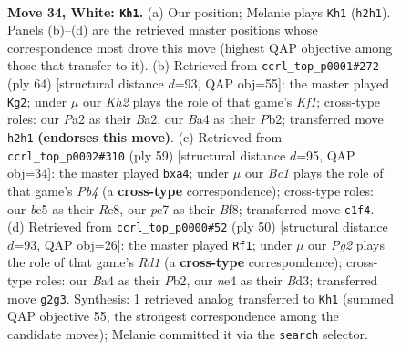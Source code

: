 \documentclass[11pt]{article}
\begin{document}
\clearpage

\begin{figure}[p]\centering
\begin{subfigure}{0.46\textwidth}\centering
\resizebox{\linewidth}{!}{%
\newchessgame
\chessboard[
  setfen={r1b5/ppp2ppk/7p/3qb3/BQ2n3/5P1P/PP4PK/R1B5 w - - 8 34},
  showmover=false,
  pgfstyle=straightmove, color=movearrow, markmove={h2-h1}
]}
\caption{}
\end{subfigure}\hfill
\begin{subfigure}{0.46\textwidth}\centering
\resizebox{\linewidth}{!}{%
\newchessgame
\chessboard[
  setfen={3r4/pp4k1/q6p/P2p1p2/1Q1bp3/6P1/BPR2P1P/5K2 w - - 2 33},
  showmover=false,
  pgfstyle=straightmove, color=movearrow, markmove={f1-g2}
]}
\caption{}
\end{subfigure}
\\[4pt]
\begin{subfigure}{0.46\textwidth}\centering
\resizebox{\linewidth}{!}{%
\newchessgame
\chessboard[
  setfen={4rb2/1bq2p1k/6pp/1pp1P2n/P7/1B2QN1P/1B3PP1/2R3K1 b - - 0 30},
  showmover=false,
  pgfstyle=straightmove, color=movearrow, markmove={b5-a4}
]}
\caption{}
\end{subfigure}\hfill
\begin{subfigure}{0.46\textwidth}\centering
\resizebox{\linewidth}{!}{%
\newchessgame
\chessboard[
  setfen={5rbk/1p4pp/2n5/p1q5/3pQ3/P2B2B1/1PP3PP/2KR4 w - - 3 26},
  showmover=false,
  pgfstyle=straightmove, color=movearrow, markmove={d1-f1}
]}
\caption{}
\end{subfigure}
\caption{\textbf{Move 34, White: \texttt{Kh1}.} (a) Our position; Melanie plays \texttt{Kh1} (\texttt{h2h1}). Panels (b)--(d) are the retrieved master positions whose correspondence most drove this move (highest QAP objective among those that transfer to it). (b) Retrieved from \texttt{ccrl\_top\_p0001\#272} (ply 64) [structural distance $d$=93, QAP obj=55]: the master played \texttt{Kg2}; under $\mu$ our \emph{Kh2} plays the role of that game's \emph{Kf1}; cross-type roles: our \emph{P}a2 as their \emph{B}a2, our \emph{B}a4 as their \emph{P}b2; transferred move \texttt{h2h1} \textbf{(endorses this move)}. (c) Retrieved from \texttt{ccrl\_top\_p0002\#310} (ply 59) [structural distance $d$=95, QAP obj=34]: the master played \texttt{bxa4}; under $\mu$ our \emph{Bc1} plays the role of that game's \emph{Pb4} (a \textbf{cross-type} correspondence); cross-type roles: our \emph{b}e5 as their \emph{R}e8, our \emph{p}c7 as their \emph{B}f8; transferred move \texttt{c1f4}. (d) Retrieved from \texttt{ccrl\_top\_p0000\#52} (ply 50) [structural distance $d$=93, QAP obj=26]: the master played \texttt{Rf1}; under $\mu$ our \emph{Pg2} plays the role of that game's \emph{Rd1} (a \textbf{cross-type} correspondence); cross-type roles: our \emph{B}a4 as their \emph{P}b2, our \emph{n}e4 as their \emph{B}d3; transferred move \texttt{g2g3}. Synthesis: 1 retrieved analog transferred to \texttt{Kh1} (summed QAP objective 55, the strongest correspondence among the candidate moves); Melanie committed it via the \texttt{search} selector.}
\label{fig:thought-m66}
\end{figure}
\end{document}
